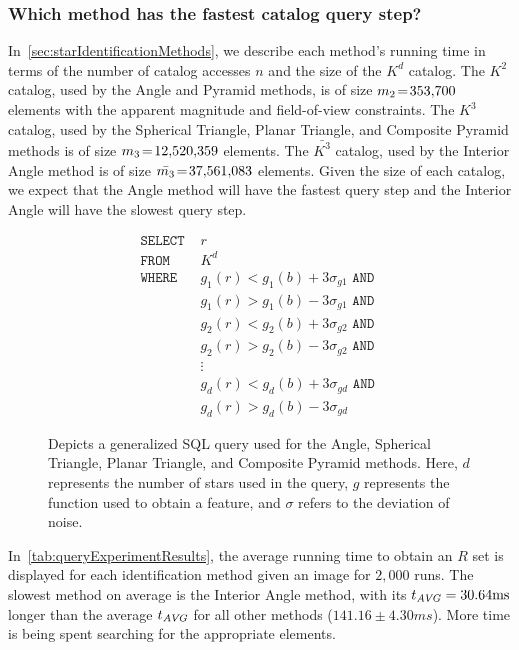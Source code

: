 \documentclass[conference]{IEEEtran}
\begin{document}
    \subsubsection{Which method has the fastest catalog query step?}
    In~\autoref{sec:starIdentificationMethods}, we describe each method's running time in terms of the number of catalog
    accesses $n$ and the size of the $K^d$ catalog.
    The $K^2$ catalog, used by the Angle and Pyramid methods, is of size $m_2 \seq 353{,}700$ elements with the apparent
    magnitude and field-of-view constraints.
    The $K^3$ catalog, used by the Spherical Triangle, Planar Triangle, and Composite Pyramid methods is of size
    $m_3 \seq 12{,}520{,}359$ elements.
    The $\bar{K^3}$ catalog, used by the Interior Angle method is of size $\bar{m_3} \seq 37{,}561{,}083$ elements.
    Given the size of each catalog, we expect that the Angle method will have the fastest query step and the Interior Angle
    will have the slowest query step.

    \begin{figure}
        \begin{align*}
            \texttt{SELECT } &r \\
            \texttt{FROM } &K^d \\
            \texttt{WHERE } &g_1(r) < g_1(b) + 3\sigma_{g1} \texttt{ AND } \\
            &g_1(r) > g_1(b) - 3\sigma_{g1} \texttt{ AND } \\
            &g_2(r) < g_2(b) + 3\sigma_{g2} \texttt{ AND } \\
            &g_2(r) > g_2(b) - 3\sigma_{g2} \texttt{ AND } \\
            &\vdots \\
            &g_d(r) < g_d(b) + 3\sigma_{gd} \texttt{ AND } \\
            &g_d(r) > g_d(b) - 3\sigma_{gd}
        \end{align*}
        \caption{
        Depicts a generalized SQL query used for the Angle, Spherical Triangle, Planar Triangle, and Composite Pyramid
        methods.
        Here, $d$ represents the number of stars used in the query, $g$ represents the function used to obtain a feature,
        and $\sigma$ refers to the deviation of noise.
        }\label{fig:sqlQuery}
    \end{figure}

    In~\autoref{tab:queryExperimentResults}, the average running time to obtain an $R$ set is displayed for each
    identification method given an image for $2{,}000$ runs.
    The slowest method on average is the Interior Angle method, with its $t_{\AVG} = 30.64 \si{ms}$ longer than the average
    $t_{\AVG}$ for all other methods ($141.16 \pm 4.30 \si{ms}$).
    More time is being spent searching for the appropriate elements.
\end{document}
